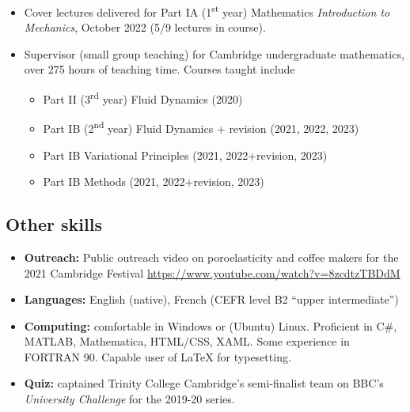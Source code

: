 \documentclass[a4paper]{article}
\begin{document}
\begin{multicols}{2}
\begin{itemize}
\begin{multicols}{2}
\begin{small}
                        \end{small}
                    \end{multicols}
                \item Cover lectures delivered for Part IA (1\textsuperscript{st} year) Mathematics \textit{Introduction to Mechanics}, October 2022 (5/9 lectures in course).\vspace{-0.5em}
                \item Supervisor (small group teaching) for Cambridge undergraduate mathematics, over 275 hours of teaching time. Courses taught include \vspace{-0.5em}
                \begin{small}
                    \begin{itemize}
                        \item Part II (3\textsuperscript{rd} year) Fluid Dynamics (2020)\vspace{-0.5em}
                        \item Part IB (2\textsuperscript{nd} year) Fluid Dynamics + revision (2021, 2022, 2023)\vspace{-0.5em}
                        \item Part IB Variational Principles (2021, 2022+revision, 2023)\vspace{-0.5em}
                        \item Part IB Methods (2021, 2022+revision, 2023)\vspace{-0.5em}
                    \end{itemize}
                \end{small}
            \end{itemize}
            \newcolumn
        \subsection*{Other skills}
            \begin{itemize}
                \item \textbf{Outreach:} Public outreach video on poroelasticity and coffee makers for the 2021 Cambridge Festival \href{https://www.youtube.com/watch?v=8zcdtzTBDdM}{https://www.youtube.com/watch?v=8zcdtzTBDdM}
                \item \textbf{Languages:} English (native), French (CEFR level B2 ``upper intermediate'')
                \item \textbf{Computing:} comfortable in Windows or (Ubuntu) Linux. Proficient in C\#, MATLAB, Mathematica, HTML/CSS, XAML. Some experience in FORTRAN 90. Capable user of \LaTeX  \; for typesetting.
                \item \textbf{Quiz:}  captained Trinity College Cambridge's semi-finalist team on BBC's \emph{University Challenge} for the 2019-20 series.
            \end{itemize}

\end{multicols}
\end{document}
